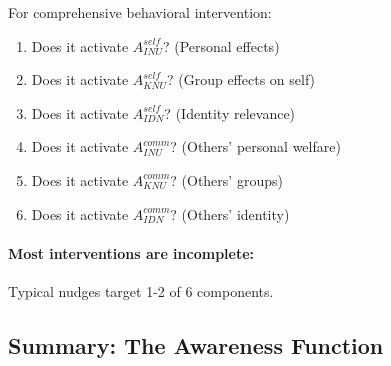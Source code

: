 For comprehensive behavioral intervention:

\begin{enumerate}
\item Does it activate $A^{self}_{INU}$? (Personal effects)
\item Does it activate $A^{self}_{KNU}$? (Group effects on self)
\item Does it activate $A^{self}_{IDN}$? (Identity relevance)
\item Does it activate $A^{comm}_{INU}$? (Others' personal welfare)
\item Does it activate $A^{comm}_{KNU}$? (Others' groups)
\item Does it activate $A^{comm}_{IDN}$? (Others' identity)
\end{enumerate}

\paragraph{Most interventions are incomplete:}
Typical nudges target 1-2 of 6 components.

\subsection{Summary: The Awareness Function}
\label{subsec:awareness-summary}


